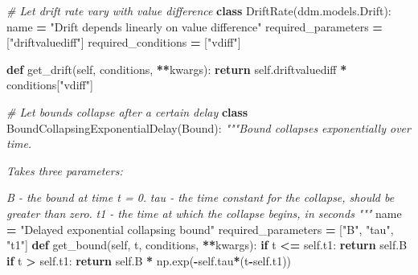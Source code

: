 \documentclass[
]{book}
\newenvironment{Shaded}{\begin{snugshade}}{\end{snugshade}}
\newcommand{\CommentTok}[1]{\textcolor[rgb]{0.56,0.35,0.01}{\textit{#1}}}
\newcommand{\ControlFlowTok}[1]{\textcolor[rgb]{0.13,0.29,0.53}{\textbf{#1}}}
\newcommand{\KeywordTok}[1]{\textcolor[rgb]{0.13,0.29,0.53}{\textbf{#1}}}
\newcommand{\NormalTok}[1]{#1}
\newcommand{\OperatorTok}[1]{\textcolor[rgb]{0.81,0.36,0.00}{\textbf{#1}}}
\newcommand{\StringTok}[1]{\textcolor[rgb]{0.31,0.60,0.02}{#1}}
\newcommand{\VariableTok}[1]{\textcolor[rgb]{0.00,0.00,0.00}{#1}}
\begin{document}
\begin{Shaded}
\begin{Highlighting}[]
\CommentTok{\# Let drift rate vary with value difference}
\KeywordTok{class}\NormalTok{ DriftRate(ddm.models.Drift):}
\NormalTok{  name }\OperatorTok{=} \StringTok{"Drift depends linearly on value difference"}
\NormalTok{  required\_parameters }\OperatorTok{=}\NormalTok{ [}\StringTok{"driftvaluediff"}\NormalTok{]}
\NormalTok{  required\_conditions }\OperatorTok{=}\NormalTok{ [}\StringTok{"vdiff"}\NormalTok{]}
  
  \KeywordTok{def}\NormalTok{ get\_drift(}\VariableTok{self}\NormalTok{, conditions, }\OperatorTok{**}\NormalTok{kwargs):}
    \ControlFlowTok{return} \VariableTok{self}\NormalTok{.driftvaluediff }\OperatorTok{*}\NormalTok{ conditions[}\StringTok{"vdiff"}\NormalTok{]}
    
\CommentTok{\# Let bounds collapse after a certain delay}
\KeywordTok{class}\NormalTok{ BoundCollapsingExponentialDelay(Bound):}
    \CommentTok{"""Bound collapses exponentially over time.}

\CommentTok{    Takes three parameters: }

\CommentTok{    \textasciigrave{}B\textasciigrave{} {-} the bound at time t = 0.}
\CommentTok{    \textasciigrave{}tau\textasciigrave{} {-} the time constant for the collapse, should be greater than}
\CommentTok{    zero.}
\CommentTok{    \textasciigrave{}t1\textasciigrave{} {-} the time at which the collapse begins, in seconds}
\CommentTok{    """}
\NormalTok{    name }\OperatorTok{=} \StringTok{"Delayed exponential collapsing bound"}
\NormalTok{    required\_parameters }\OperatorTok{=}\NormalTok{ [}\StringTok{"B"}\NormalTok{, }\StringTok{"tau"}\NormalTok{, }\StringTok{"t1"}\NormalTok{]}
    \KeywordTok{def}\NormalTok{ get\_bound(}\VariableTok{self}\NormalTok{, t, conditions, }\OperatorTok{**}\NormalTok{kwargs):}
        \ControlFlowTok{if}\NormalTok{ t }\OperatorTok{\textless{}=} \VariableTok{self}\NormalTok{.t1:}
            \ControlFlowTok{return} \VariableTok{self}\NormalTok{.B}
        \ControlFlowTok{if}\NormalTok{ t }\OperatorTok{\textgreater{}} \VariableTok{self}\NormalTok{.t1:}
            \ControlFlowTok{return} \VariableTok{self}\NormalTok{.B }\OperatorTok{*}\NormalTok{ np.exp(}\OperatorTok{{-}}\VariableTok{self}\NormalTok{.tau}\OperatorTok{*}\NormalTok{(t}\OperatorTok{{-}}\VariableTok{self}\NormalTok{.t1))}


\end{Highlighting}
\end{Shaded}
\end{document}

